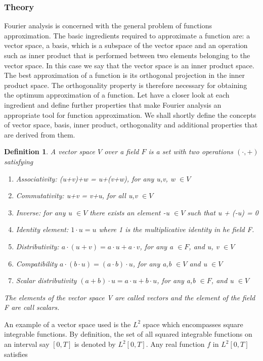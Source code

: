 \documentclass[11pt, oneside]{article}   	%
\newtheorem{definition}{Definition}
\begin{document}
\subsubsection{Theory}
Fourier analysis is concerned with the general problem of functions approximation. The basic ingredients required to approximate a function are: a vector space, a basis, which is a subspace of the vector space and an operation such as inner product that is performed between two elements belonging to the vector space. In this case we say that the vector space is an inner product space. The best approximation of a function is its orthogonal projection in the inner product space. The orthogonality property is therefore  necessary for obtaining the optimum approximation of a function.
\justify
Let have a closer look at each ingredient and define further properties that make Fourier analysis an appropriate tool for function approximation. We shall shortly define the concepts of vector space, basis, inner product, orthogonality and additional properties that are derived from them.
\begin{definition}
A vector space $V$ over a field $F$ is a set  with two operations $(\cdot, +)$ satisfying 
\begin{enumerate}
\item Associativity:  (u+v)+w = u+(v+w), for any u,v, w $\in V$
\item Commutativity: u+v = v+u, for all u,v $\in V$
\item Inverse: for any u $\in V$ there exists an element -u $\in V$ such that u + (-u) = 0
\item Identity element: $1\cdot u = u$ where 1 is the multiplicative identity in he field F.
\item Distributivity: $a\cdot(u+v) = a\cdot u + a\cdot v$, for any a $\in F$, and u, v $\in V$
\item Compatibility $a\cdot(b\cdot u) = (a\cdot b)\cdot u$, for any a,b $\in V$ and u $\in V$
\item Scalar distributivity $(a+b)\cdot u = a\cdot u + b\cdot u$, for any a,b $\in F$, and u $\in V$
\end{enumerate}
The elements of the vector space V are called vectors and the element of the field F are call scalars.
\end{definition}
An example of a vector space used is the $L^{2}$ space which encompasses square integrable functions. By definition, the set of all squared integrable functions on an interval say $[0,T]$ is denoted by 
$L^{2}[0,T]$. Any real function $f$ in $L^{2}[0,T]$ satisfies
\end{document}
